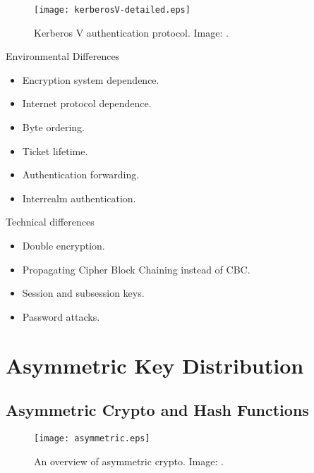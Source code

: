 \documentclass{beamer}
\begin{document}
\begin{frame}{\insertsubsectionhead}
  \begin{figure}
    \texttt{[image: kerberosV-detailed.eps]}
    \caption{Kerberos V authentication protocol.
      Image: \cite{Stallings2013nse}.
    }
  \end{figure}
\end{frame}

\begin{frame}{\insertsubsectionhead}{Environmental Differences}
  \begin{itemize}
    \item Encryption system dependence.
    \item Internet protocol dependence.
    \item Byte ordering.
    \item Ticket lifetime.
    \item Authentication forwarding.
    \item Interrealm authentication.
  \end{itemize}
\end{frame}

\begin{frame}{\insertsubsectionhead}{Technical differences}
  \begin{itemize}
    \item Double encryption.
    \item Propagating Cipher Block Chaining instead of CBC.
    \item Session and subsession keys.
    \item Password attacks.
  \end{itemize}
\end{frame}


\section{Asymmetric Key Distribution}

\subsection{Asymmetric Crypto and Hash Functions}

\begin{frame}{\insertsubsectionhead}
  \begin{figure}
    \texttt{[image: asymmetric.eps]}
    \caption{An overview of asymmetric crypto.
      Image: \cite{Stallings2013nse}.
    }
  \end{figure}
\end{frame}
\end{document}
